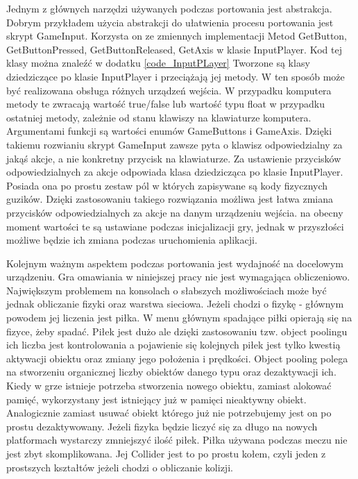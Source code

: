 \documentclass[a4paper,12pt,twoside,openany]{report}
\begin{document}
Jednym z głównych narzędzi używanych podczas portowania jest abstrakcja. Dobrym przykładem użycia abstrakcji do ułatwienia procesu portowania jest skrypt GameInput. Korzysta on ze zmiennych implementacji Metod GetButton, GetButtonPressed, GetButtonReleased, GetAxis w klasie InputPlayer. Kod tej klasy można znaleźć w dodatku \ref{code_InputPLayer} Tworzone są klasy dziedziczące po  klasie InputPlayer i przeciążają jej metody. W ten sposób może być realizowana obsługa różnych urządzeń wejścia. W przypadku komputera metody te zwracają wartość true/false lub wartość typu float w przypadku ostatniej metody, zależnie od stanu klawiszy na klawiaturze komputera. Argumentami funkcji są wartości enumów GameButtons i GameAxis. Dzięki takiemu rozwianiu skrypt GameInput zawsze pyta o klawisz odpowiedzialny za jakąś akcje, a nie konkretny przycisk na klawiaturze. Za ustawienie przycisków odpowiedzialnych za akcje odpowiada klasa dziedzicząca po klasie InputPlayer. Posiada ona po prostu zestaw pól w których zapisywane są kody fizycznych guzików. Dzięki zastosowaniu takiego rozwiązania możliwa jest łatwa zmiana przycisków odpowiedzialnych za akcje na danym urządzeniu wejścia. na obecny moment wartości te są ustawiane podczas inicjalizacji gry, jednak w przyszłości możliwe będzie ich zmiana podczas uruchomienia aplikacji.

Kolejnym ważnym aspektem podczas portowania jest wydajność na docelowym urządzeniu. Gra omawiania w niniejszej pracy nie jest wymagająca obliczeniowo. Największym problemem na konsolach o słabszych możliwościach może być jednak obliczanie fizyki oraz warstwa sieciowa. Jeżeli chodzi o fizykę - głównym powodem jej liczenia jest piłka. W menu głównym spadające piłki opierają się na fizyce, żeby spadać. Piłek jest dużo ale dzięki zastosowaniu tzw. object poolingu ich liczba jest kontrolowania a pojawienie się kolejnych piłek jest tylko kwestią aktywacji obiektu oraz zmiany jego położenia i prędkości. Object pooling polega na stworzeniu organicznej liczby obiektów danego typu oraz dezaktywacji ich. Kiedy w grze istnieje potrzeba stworzenia nowego obiektu, zamiast alokować pamięć, wykorzystany jest istniejący już w pamięci nieaktywny obiekt. Analogicznie zamiast usuwać obiekt którego już nie potrzebujemy jest on po prostu dezaktywowany. Jeżeli fizyka będzie liczyć się za długo na nowych platformach wystarczy zmniejszyć ilość piłek. Piłka używana podczas meczu nie jest zbyt skomplikowana. Jej Collider jest to po prostu kołem, czyli jeden z prostszych kształtów jeżeli chodzi o obliczanie kolizji.
\end{document}
